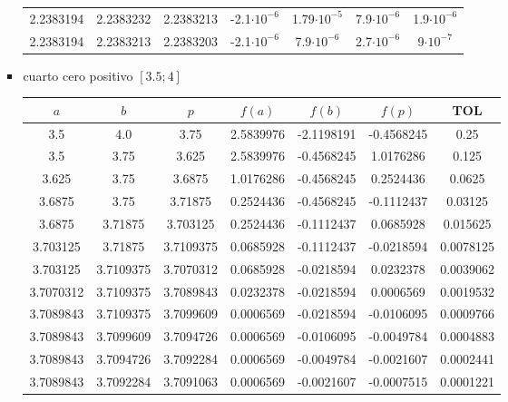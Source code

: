 \documentclass[12pt]{article}
\begin{document}
\begin{enumerate}
\begin{enumerate}
\begin{itemize}
\begin{center}
\begin{tabular}{|c|c|c|c|c|c|c|}
            2.2383194 & 2.2383232 & 2.2383213 & -2.1\(\cdot 10^{-6}\) & 1.79\(\cdot 10^{-5}\) & 7.9\(\cdot 10^{-6}\) & 1.9\(\cdot 10^{-6}\) \\
            2.2383194 & 2.2383213 & 2.2383203 & -2.1\(\cdot 10^{-6}\) & 7.9\(\cdot 10^{-6}\) & 2.7\(\cdot 10^{-6}\) & 9\(\cdot 10^{-7}\) \\
            \hline 
            \end{tabular}
            \end{center}



            \item cuarto cero positivo \([3.5; 4]\)

            \begin{center}
            \begin{tabular}{|c|c|c|c|c|c|c|}
            \hline
            \(a\) & \(b\)& \(p\)&\(f(a)\) & \(f(b)\) & \(f(p)\)&\textbf{TOL} \\
            \hline
            3.5 & 4.0 & 3.75 & 2.5839976 & -2.1198191 & -0.4568245 & 0.25 \\
            3.5 & 3.75 & 3.625 & 2.5839976 & -0.4568245 & 1.0176286 & 0.125 \\
            3.625 & 3.75 & 3.6875 & 1.0176286 & -0.4568245 & 0.2524436 & 0.0625 \\
            3.6875 & 3.75 & 3.71875 & 0.2524436 & -0.4568245 & -0.1112437 & 0.03125 \\
            3.6875 & 3.71875 & 3.703125 & 0.2524436 & -0.1112437 & 0.0685928 & 0.015625 \\
            3.703125 & 3.71875 & 3.7109375 & 0.0685928 & -0.1112437 & -0.0218594 & 0.0078125 \\
            3.703125 & 3.7109375 & 3.7070312 & 0.0685928 & -0.0218594 & 0.0232378 & 0.0039062 \\
            3.7070312 & 3.7109375 & 3.7089843 & 0.0232378 & -0.0218594 & 0.0006569 & 0.0019532 \\
            3.7089843 & 3.7109375 & 3.7099609 & 0.0006569 & -0.0218594 & -0.0106095 & 0.0009766 \\
            3.7089843 & 3.7099609 & 3.7094726 & 0.0006569 & -0.0106095 & -0.0049784 & 0.0004883 \\
            3.7089843 & 3.7094726 & 3.7092284 & 0.0006569 & -0.0049784 & -0.0021607 & 0.0002441 \\
            3.7089843 & 3.7092284 & 3.7091063 & 0.0006569 & -0.0021607 & -0.0007515 & 0.0001221 \\

\end{tabular}
\end{center}
\end{itemize}
\end{enumerate}
\end{enumerate}
\end{document}
